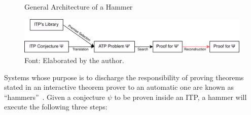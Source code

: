 \begin{figure}[t]
  \caption{General Architecture of a Hammer}\label{fig:archHamm}
  \includegraphics[scale=0.15]{img/hammerArch.png}
  \caption*{Font: Elaborated by the author.}
\end{figure}

\label{sec:hammering}


Systems whose purpose is to discharge the responsibility of proving theorems stated in
an interactive theorem prover to an automatic one are known as ``hammers''~\cite{hammering}.
Given a conjecture $\psi$ to be proven inside an ITP, a hammer will execute the following three steps:

